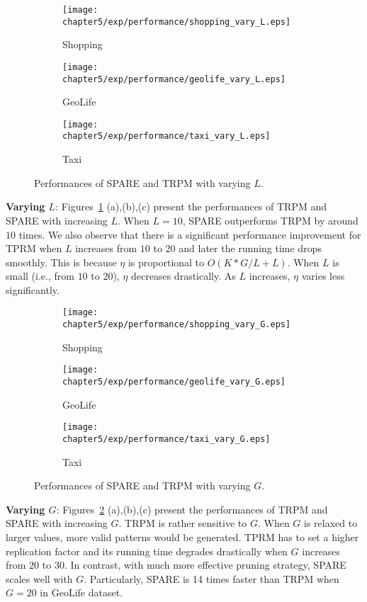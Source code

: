 \begin{figure}[h]
\centering
 \begin{subfigure}[b]{0.3\textwidth}
        \texttt{[image: chapter5/exp/performance/shopping\_vary\_L.eps]}
	     \caption{Shopping}	
 \end{subfigure}
 \begin{subfigure}[b]{0.3\textwidth}
        \texttt{[image: chapter5/exp/performance/geolife\_vary\_L.eps]}
        \caption{GeoLife}
    \end{subfigure}
 \begin{subfigure}[b]{0.3\textwidth}
      \texttt{[image: chapter5/exp/performance/taxi\_vary\_L.eps]}
      \caption{Taxi}
 \end{subfigure}
\caption{Performances of SPARE and TRPM with varying $L$.}
\label{exp:performance_vary_l}
\end{figure}

\textbf{Varying $L$}: Figures~\ref{exp:performance_vary_l} (a),(b),(c) present the performances of TRPM and SPARE with increasing $L$. When $L=10$, SPARE outperforms TRPM by around $10$ times. We also observe that there is a significant performance improvement for TPRM when $L$ increases from $10$ to $20$ and later the running time drops smoothly. 
This is because $\eta$ is proportional to $O(K*G/L+L)$. When $L$ is small (i.e., from $10$ to $20$),
$\eta$ decreases drastically. As $L$ increases, $\eta$ varies less significantly.


\begin{figure}[h]
\centering
 \begin{subfigure}[b]{0.3\textwidth}
        \texttt{[image: chapter5/exp/performance/shopping\_vary\_G.eps]}
	     \caption{Shopping}	
 \end{subfigure}
 \begin{subfigure}[b]{0.3\textwidth}
        \texttt{[image: chapter5/exp/performance/geolife\_vary\_G.eps]}
        \caption{GeoLife}
    \end{subfigure}
 \begin{subfigure}[b]{0.3\textwidth}
      \texttt{[image: chapter5/exp/performance/taxi\_vary\_G.eps]}
      \caption{Taxi}
 \end{subfigure}
\caption{Performances of SPARE and TRPM with varying $G$.}
\label{exp:performance_vary_g}
\end{figure}


\textbf{Varying $G$}: Figures~\ref{exp:performance_vary_g} (a),(b),(c) present the performances of TRPM and SPARE with increasing $G$.  TRPM is rather sensitive to $G$. When $G$ is relaxed to larger values, more valid patterns would be generated. TPRM has to set a higher replication factor and its running time degrades drastically when $G$ increases from $20$ to $30$. In contrast, with much more effective pruning strategy, SPARE scales well with $G$. Particularly, SPARE is 14 times faster than TRPM when $G=20$ in GeoLife dataset.

